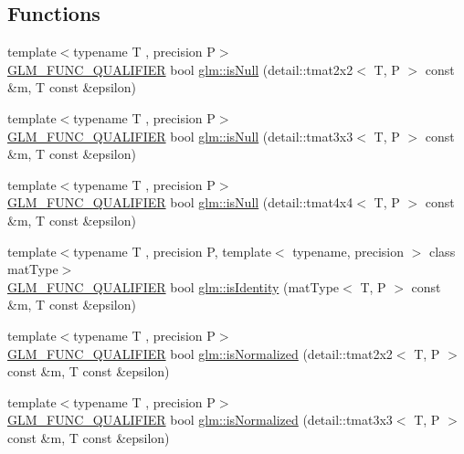 \subsection*{Functions}
\begin{DoxyCompactItemize}
\item 
{\footnotesize template$<$typename T , precision P$>$ }\\\hyperlink{setup_8hpp_a33fdea6f91c5f834105f7415e2a64407}{G\+L\+M\+\_\+\+F\+U\+N\+C\+\_\+\+Q\+U\+A\+L\+I\+F\+I\+ER} bool \hyperlink{group__gtx__matrix__query_gaf7e38680b67a3589a262d281660e4694}{glm\+::is\+Null} (detail\+::tmat2x2$<$ T, P $>$ const \&m, T const \&epsilon)
\item 
{\footnotesize template$<$typename T , precision P$>$ }\\\hyperlink{setup_8hpp_a33fdea6f91c5f834105f7415e2a64407}{G\+L\+M\+\_\+\+F\+U\+N\+C\+\_\+\+Q\+U\+A\+L\+I\+F\+I\+ER} bool \hyperlink{group__gtx__matrix__query_ga7a6ef9f174fec0224214ff5ba6c27ba4}{glm\+::is\+Null} (detail\+::tmat3x3$<$ T, P $>$ const \&m, T const \&epsilon)
\item 
{\footnotesize template$<$typename T , precision P$>$ }\\\hyperlink{setup_8hpp_a33fdea6f91c5f834105f7415e2a64407}{G\+L\+M\+\_\+\+F\+U\+N\+C\+\_\+\+Q\+U\+A\+L\+I\+F\+I\+ER} bool \hyperlink{group__gtx__matrix__query_ga5b8d7b0c7bf1d48ff8df10321440a61a}{glm\+::is\+Null} (detail\+::tmat4x4$<$ T, P $>$ const \&m, T const \&epsilon)
\item 
{\footnotesize template$<$typename T , precision P, template$<$ typename, precision $>$ class mat\+Type$>$ }\\\hyperlink{setup_8hpp_a33fdea6f91c5f834105f7415e2a64407}{G\+L\+M\+\_\+\+F\+U\+N\+C\+\_\+\+Q\+U\+A\+L\+I\+F\+I\+ER} bool \hyperlink{group__gtx__matrix__query_gafc1ce12c738b8c5d007179e615609330}{glm\+::is\+Identity} (mat\+Type$<$ T, P $>$ const \&m, T const \&epsilon)
\item 
{\footnotesize template$<$typename T , precision P$>$ }\\\hyperlink{setup_8hpp_a33fdea6f91c5f834105f7415e2a64407}{G\+L\+M\+\_\+\+F\+U\+N\+C\+\_\+\+Q\+U\+A\+L\+I\+F\+I\+ER} bool \hyperlink{group__gtx__matrix__query_gaae7339fac94c86ed741f20b6915682ab}{glm\+::is\+Normalized} (detail\+::tmat2x2$<$ T, P $>$ const \&m, T const \&epsilon)
\item 
{\footnotesize template$<$typename T , precision P$>$ }\\\hyperlink{setup_8hpp_a33fdea6f91c5f834105f7415e2a64407}{G\+L\+M\+\_\+\+F\+U\+N\+C\+\_\+\+Q\+U\+A\+L\+I\+F\+I\+ER} bool \hyperlink{group__gtx__matrix__query_gab4c4106cd851951bad5e78a83bfc75dd}{glm\+::is\+Normalized} (detail\+::tmat3x3$<$ T, P $>$ const \&m, T const \&epsilon)

\end{DoxyCompactItemize}
